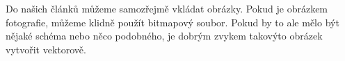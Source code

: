\documentclass[a4paper, 11pt, a4paper]{article}
\begin{document}
Do našich článků můžeme samozřejmě vkládat obrázky. 
Pokud je obrázkem fotografie, můžeme klidně použít bitmapový soubor. 
Pokud by to ale mělo být nějaké schéma nebo něco podobného, je dobrým zvykem takovýto obrázek vytvořit vektorově.

\begin{figure}[h]
    \centering
\end{figure}
\end{document}
